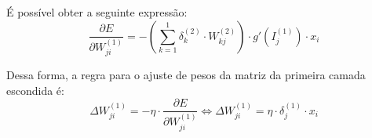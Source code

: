 \documentclass{article}
\begin{document}
\par É possível obter a seguinte expressão:
\begin{equation}
  \frac{\partial E}{\partial W_{ji}^{(1)}}= - ( \sum_{k=1}^{1} \delta_{k}^{(2)} \cdot W_{kj}^{(2)}) \cdot g'(I_{j}^{(1)}) \cdot x_{i}
\end{equation}

\par Dessa forma, a regra para o ajuste de pesos da matriz da primeira camada escondida é:
\begin{equation}
  \Delta W_{ji}^{(1)} = - \eta \cdot \frac{\partial E}{\partial W_{ji}^{(1)}} \Longleftrightarrow \Delta W_{ji}^{(1)} = \eta \cdot \delta_{j}^{(1)} \cdot x_{i}
  \label{eq:5.36}
\end{equation}
\end{document}
